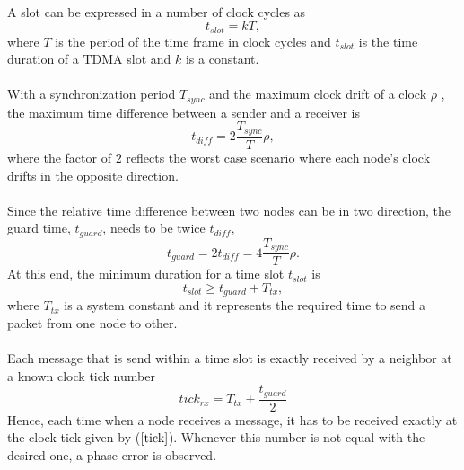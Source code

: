 \documentclass[a4paper,10pt]{report}
\begin{document}
\paragraph*{}
A slot can be expressed in a number of clock cycles as
\begin{equation}
t_{slot} = kT ,
\end{equation}
where $T$ is the period of the time frame in clock cycles and $t_{slot}$ is the time duration of a TDMA slot and $k$ is a constant.
\paragraph*{}
With a synchronization period $T_{sync}$ and the maximum clock drift of a clock $\rho$ , the maximum time difference between a sender and a receiver is
\begin{equation}
t_{diff} = 2\frac{T_{sync}}{T}\rho ,
\end{equation}
where the factor of $2$ reflects the worst case scenario where each node's clock drifts in the opposite direction.
\paragraph*{}
Since the relative time difference between two nodes can be in two direction, the guard time, $t_{guard}$, needs to be twice $t_{diff}$,
\begin{equation}
t_{guard}= 2t_{diff} = 4\frac{T_{sync}}{T}\rho.
\end{equation}
At this end, the minimum duration for a time slot $t_{slot}$ is
\begin{equation}
t_{slot} \geq t_{guard} + T_{tx},
\end{equation}
where $T_{tx}$ is a system constant and it represents the required time to send a packet from one node to other.
\paragraph*{} Each message that is send within a time slot is exactly received by a neighbor at a known clock tick number
\begin{equation}
tick_{rx} = T_{tx}+ \frac{t_{guard}}{2} \label{tick}
\end{equation}
Hence, each time when a node receives a message, it has to be received exactly at the clock tick given by ($\ref{tick}$). Whenever
this number is not equal with the desired one, a phase error is observed.
\end{document}
